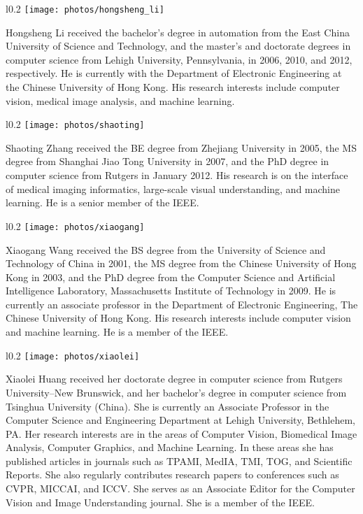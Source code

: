 \documentclass[10pt,journal,letterpaper,compsoc]{IEEEtran}
\begin{document}
\vspace{+5pt}
\begin{wrapfigure}{l}{0.2\columnwidth}
\texttt{[image: photos/hongsheng\_li]}
\end{wrapfigure}
Hongsheng Li received the bachelor’s degree in automation from the East China University of Science and Technology, and the master’s and doctorate degrees in computer science from Lehigh University, Pennsylvania, in 2006, 2010, and 2012, respectively. He is currently with the Department of Electronic Engineering at the Chinese University of Hong Kong. His research interests include computer vision, medical image analysis, and machine learning.
\\

\vspace{+5pt}
\begin{wrapfigure}{l}{0.2\columnwidth}
\texttt{[image: photos/shaoting]}
\end{wrapfigure}
Shaoting Zhang received the BE degree from Zhejiang University in 2005, the MS degree from Shanghai Jiao Tong University in 2007, and the PhD degree in computer science from Rutgers in January 2012. His research is on the interface of medical imaging informatics, large-scale visual understanding, and machine learning. He is a senior member of the IEEE. 
\\


\vspace{+85pt}
\begin{wrapfigure}{l}{0.2\columnwidth}
\texttt{[image: photos/xiaogang]}
\end{wrapfigure}
Xiaogang Wang received the BS degree from the University of Science and Technology of China in 2001, the MS degree from the Chinese University
of Hong Kong in 2003, and the PhD degree from the Computer Science and Artificial Intelligence Laboratory, Massachusetts Institute of Technology
in 2009. He is currently an associate professor in the Department of Electronic Engineering, The Chinese University of Hong Kong. His research
interests include computer vision and machine
learning. He is a member of the IEEE.


\vspace{+5pt}
\begin{wrapfigure}{l}{0.2\columnwidth}
\texttt{[image: photos/xiaolei]}
\end{wrapfigure}
Xiaolei Huang received her doctorate degree in computer science from Rutgers University--New Brunswick, and her bachelor's degree in computer science from Tsinghua University (China). She is currently an Associate Professor in the Computer Science and Engineering Department at Lehigh University, Bethlehem, PA. Her research interests are in the areas of Computer Vision, Biomedical Image Analysis, Computer Graphics, and Machine Learning.  In these areas she has published articles in journals such as TPAMI, MedIA, TMI, TOG, and Scientific Reports. She also regularly contributes research papers to conferences such as CVPR, MICCAI, and ICCV. She serves as an Associate Editor for the Computer Vision and Image Understanding journal. She is a member of the IEEE.
\end{document}
